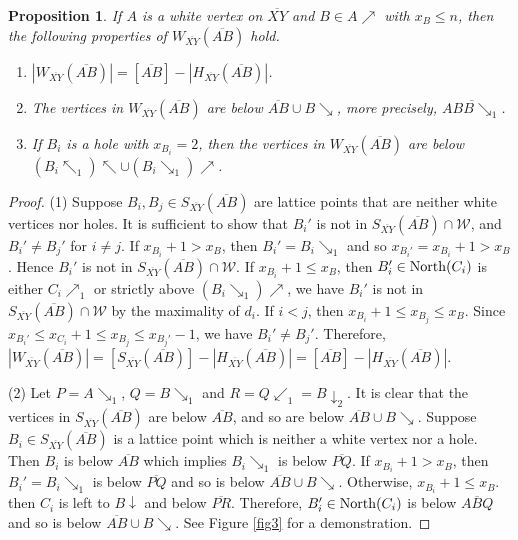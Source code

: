 \documentclass[preprint,12pt]{elsarticle}
\newtheorem{proposition}[theorem]{Proposition}
\def\NEarrow#1{#1{\nearrow}}
\def\SEarrow#1{#1{\searrow}}
\def\NWarrow#1{#1{\nwarrow}}
\def\Southarrow#1{#1{\downarrow}}
\def\NEArrow#1#2{#1{\nearrow}_{#2}}
\def\SEArrow#1#2{#1{\searrow}_{#2}}
\def\NWArrow#1#2{#1{\nwarrow}_{#2}}
\def\SWArrow#1#2{#1{\swarrow}_{#2}}
\def\SouthArrow#1#2{#1{\downarrow}_{#2}}
\def\North{{\rm North}}
\begin{document}
{%
\begin{proposition}\label{prop6}
If $A$ is a white vertex on $\overline{XY}$ and $B\in\NEarrow{A}$ with $x_B\le n$,
then the following properties of $W_{\overline{XY}}(\overline{AB})$ hold.
\begin{enumerate}
\item[(1)]
$|W_{\overline{XY}}(\overline{AB})|=[\overline{AB}]-|H_{\overline{XY}}(\overline{AB})|$.

\item[(2)]
The vertices in $W_{\overline{XY}}(\overline{AB})$
are below $\overline{AB}\cup\SEarrow{B}$,
more precisely, $\overline{AB\SEArrow{B}{1}}$.

\item[(3)]
If $B_i$ is a hole with $x_{B_i}=2$,
then the vertices in $W_{\overline{XY}}(\overline{AB})$ are below
$\NWarrow{(\NWArrow{B_i}{1})} \cup \NEarrow{(\SEArrow{B_i}{1})}$.
\end{enumerate}
\end{proposition}
\begin{proof}
(1)
Suppose $B_i,B_j\in S_{\overline{XY}}(\overline{AB})$ are lattice points
that are neither white vertices nor holes.
It is sufficient to show that $B_i'$ is not in
$S_{\overline{XY}}(\overline{AB})\cap\mathcal{W}$,
and $B_i'\ne B_j'$ for $i\ne j$.
If $x_{B_i}+1>x_B$, then $B_i'=\SEArrow{B_i}{1}$ and
so $x_{B_i'}= x_{B_i}+1>x_B$.
Hence $B_i'$ is not in $S_{\overline{XY}}(\overline{AB})\cap\mathcal{W}$.
If $x_{B_i}+1\le x_B$,
then $B_i'\in \North(C_i)$ is either $\NEArrow{C_i}{1}$
or strictly above $\NEarrow{(\SEArrow{B_i}{1})}$,
we have $B_i'$ is not in $S_{\overline{XY}}(\overline{AB})\cap \mathcal{W}$
by the maximality of $d_i$.
If $i<j$, then $x_{B_i}+1\le x_{B_j}\le x_B$.
Since $x_{B_i'}\le x_{C_i}+1\le x_{B_j}\le x_{B_j'}-1$,
we have $B_i'\ne B_j'$.
Therefore,
$|W_{\overline{XY}}(\overline{AB})|
=[S_{\overline{XY}}(\overline{AB})]-|H_{\overline{XY}}(\overline{AB})|
=[\overline{AB}]-|H_{\overline{XY}}(\overline{AB})|$.

(2)
Let $P=\SEArrow{A}{1}$, $Q=\SEArrow{B}{1}$
and $R=\SWArrow{Q}{1}=\SouthArrow{B}{2}$.
It is clear that the vertices in $S_{\overline{XY}}(\overline{AB})$
are below $\overline{AB}$, and so are below $\overline{AB} \cup\SEarrow{B}$.
Suppose $B_i\in S_{\overline{XY}}(\overline{AB})$ is a lattice point
which is neither a white vertex nor a hole.
Then $B_i$ is below $\overline{AB}$ which implies $\SEArrow{B_i}{1}$ is below $\overline{PQ}$.
If $x_{B_i}+1>x_B$, then $B_i'=\SEArrow{B_i}{1}$
is below $\overline{PQ}$ and so is below $\overline{AB}\cup\SEarrow{B}$.
Otherwise, $x_{B_i}+1\le x_B$.
then $C_i$ is left to $\Southarrow{B}$ and below $\overline{PR}$.
Therefore, $B_{i}'\in \North(C_i)$ is below $\overline{ABQ}$
and so is below $\overline{AB}\cup\SEarrow{B}$.
See Figure \ref{fig3} for a demonstration.


\end{proof}}
\end{document}
